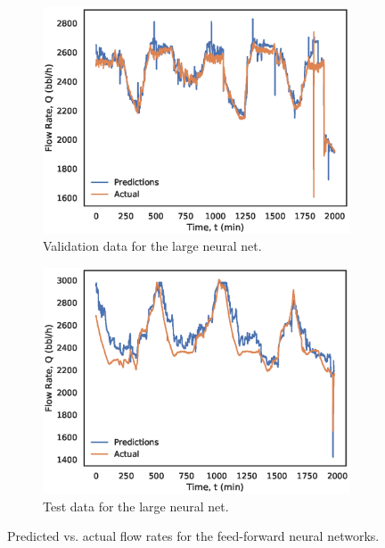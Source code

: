 \begin{figure}[p]
\begin{subfigure}[b]{0.48\textwidth}
         \includegraphics[width=\textwidth]{images/08largenn_valid.eps}
         \caption{Validation data for the large neural net.}
         \label{fig:08largenn_valid}
     \end{subfigure}
     \begin{subfigure}[b]{0.48\textwidth}
         \includegraphics[width=\textwidth]{images/08largenn_test.eps}
         \caption{Test data for the large neural net.}
         \label{fig:08largenn_test}
     \end{subfigure}
        \caption{Predicted vs. actual flow rates for the feed-forward neural networks.}
        \label{fig:08PolynomialPlots}
\end{figure}

